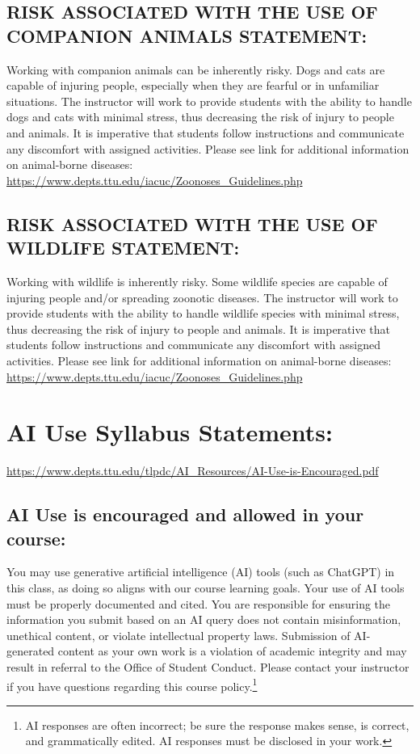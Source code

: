 \documentclass[12pt]{article}
\begin{document}
 
\subsection*{RISK ASSOCIATED WITH THE USE OF COMPANION ANIMALS STATEMENT:}

Working with companion animals can be inherently risky. Dogs and cats are capable of injuring people, especially when they are fearful or in unfamiliar situations. The instructor will work to provide students with the ability to handle dogs and cats with minimal stress, thus decreasing the risk of injury to people and animals. It is imperative that students follow instructions and communicate any discomfort with assigned activities. Please see link for additional information on animal-borne diseases: \url{https://www.depts.ttu.edu/iacuc/Zoonoses_Guidelines.php}

 
\subsection*{RISK ASSOCIATED WITH THE USE OF WILDLIFE STATEMENT:}

Working with wildlife is inherently risky. Some wildlife species are capable of injuring people and/or spreading zoonotic diseases. The instructor will work to provide students with the ability to handle wildlife species with minimal stress, thus decreasing the risk of injury to people and animals. It is imperative that students follow instructions and communicate any discomfort with assigned activities. Please see link for additional information on animal-borne diseases: \url{https://www.depts.ttu.edu/iacuc/Zoonoses_Guidelines.php}

\section*{AI Use Syllabus Statements:}
\url{https://www.depts.ttu.edu/tlpdc/AI_Resources/AI-Use-is-Encouraged.pdf}
\subsection*{AI Use is encouraged and allowed in your course:}
You may use generative artificial intelligence (AI) tools (such as ChatGPT) in this class, as doing so aligns with our course learning goals. Your use of AI tools must be properly documented and cited. You are responsible for ensuring the information you submit based on an AI query does not contain misinformation, unethical content, or violate intellectual property laws. Submission of AI-generated content as your own work is a violation of academic integrity and may result in referral to the Office of Student Conduct. Please contact your instructor if you have questions regarding this course policy.\footnote{AI responses are often incorrect; be sure the response makes sense, is correct, and grammatically edited.  AI responses must be disclosed in your work.}
\end{document}
